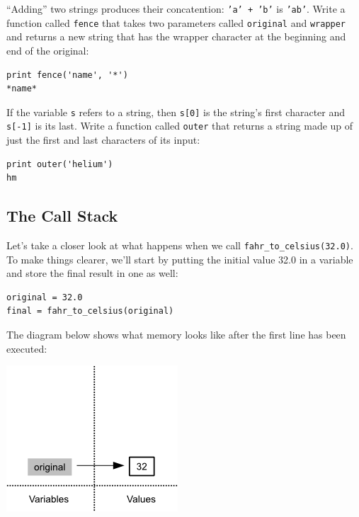 \documentclass{book}
\begin{document}
\begin{swcenumerate}
\item
  ``Adding'' two strings produces their concatention: \texttt{'a' + 'b'}
  is \texttt{'ab'}. Write a function called \texttt{fence} that takes
  two parameters called \texttt{original} and \texttt{wrapper} and
  returns a new string that has the wrapper character at the beginning
  and end of the original:

\begin{verbatim}
print fence('name', '*')
*name*
\end{verbatim}
\item
  If the variable \texttt{s} refers to a string, then \texttt{s{[}0{]}}
  is the string's first character and \texttt{s{[}-1{]}} is its last.
  Write a function called \texttt{outer} that returns a string made up
  of just the first and last characters of its input:

\begin{verbatim}
print outer('helium')
hm
\end{verbatim}
\end{swcenumerate}

\subsection{The Call Stack}

Let's take a closer look at what happens when we call
\texttt{fahr\_to\_celsius(32.0)}. To make things clearer, we'll start by
putting the initial value 32.0 in a variable and store the final result
in one as well:

\begin{verbatim}
original = 32.0
final = fahr_to_celsius(original)
\end{verbatim}

The diagram below shows what memory looks like after the first line has
been executed:

\includegraphics{novice/python/img/python-call-stack-01.png}
\end{document}
